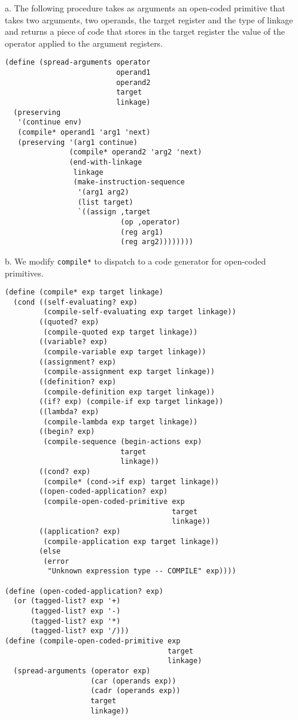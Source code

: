 \documentclass[a4paper,12pt]{article}
\newcommand{\subpar}[1]{\medskip \noindent #1.}
\begin{document}
\subpar{a} The following procedure takes as arguments an open-coded
primitive that takes two arguments, two operands, the target register
and the type of linkage and returns a piece of code that stores in the
target register the value of the operator applied to the argument
registers.

\begin{lstlisting}
(define (spread-arguments operator
                          operand1
                          operand2
                          target
                          linkage)
  (preserving
   '(continue env)
   (compile* operand1 'arg1 'next)
   (preserving '(arg1 continue)
               (compile* operand2 'arg2 'next)
               (end-with-linkage
                linkage
                (make-instruction-sequence
                 '(arg1 arg2)
                 (list target)
                 `((assign ,target
                           (op ,operator)
                           (reg arg1)
                           (reg arg2))))))))
\end{lstlisting}

\subpar{b}  We modify \lstinline!compile*! to dispatch to a code
generator for open-coded primitives.

\begin{lstlisting}
(define (compile* exp target linkage)
  (cond ((self-evaluating? exp)
         (compile-self-evaluating exp target linkage))
        ((quoted? exp)
         (compile-quoted exp target linkage))
        ((variable? exp)
         (compile-variable exp target linkage))
        ((assignment? exp)
         (compile-assignment exp target linkage))
        ((definition? exp)
         (compile-definition exp target linkage))
        ((if? exp) (compile-if exp target linkage))
        ((lambda? exp)
         (compile-lambda exp target linkage))
        ((begin? exp)
         (compile-sequence (begin-actions exp)
                           target
                           linkage))
        ((cond? exp)
         (compile* (cond->if exp) target linkage))
        ((open-coded-application? exp)
         (compile-open-coded-primitive exp
                                       target
                                       linkage))
        ((application? exp)
         (compile-application exp target linkage))
        (else
         (error
          "Unknown expression type -- COMPILE" exp))))

(define (open-coded-application? exp)
  (or (tagged-list? exp '+)
      (tagged-list? exp '-)
      (tagged-list? exp '*)
      (tagged-list? exp '/)))
(define (compile-open-coded-primitive exp
                                      target
                                      linkage)
  (spread-arguments (operator exp)
                    (car (operands exp))
                    (cadr (operands exp))
                    target
                    linkage))
\end{lstlisting}
\end{document}
